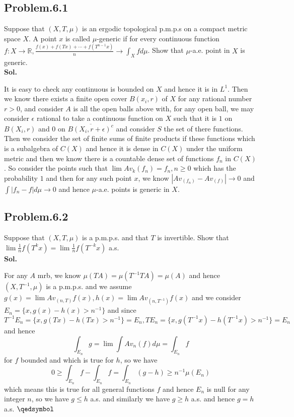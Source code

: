 \documentclass[lang=en,11pt,a4paper,citestyle =authoryear]{elegantpaper}
\newcommand{\prvd}{$\hfill \qedsymbol$}
\newcommand{\R}{\mathbb{R}}
\begin{document}
\vspace{0.5em}

\subsection*{Problem.6.1} 
Suppose that $(X,T,\mu)$ is an ergodic topological p.m.p.s on a compact metric space $X$. A point $x$ is called $\mu$-generic if for every continuous function $f:X\to\R, \tfrac{f(x)+f(Tx)+\cdots+f(T^{n-1}x)}{n} \to \int_X fd\mu$. Show that $\mu$-a.e. point in $X$ is generic.
\vspace{0.5em}\\
\textbf{Sol.} \par
It is easy to check any continuous is bounded on $X$ and hence it is in $L^1$. Then we know there exists a finite open cover $B(x_i,r)$ of $X$ for any rational number $r>0$, and consider $A$ is all the open balls above with, for any open ball, we may consider $\epsilon$ rational to take a continuous function on $X$ such that it is $1$ on $B(X_i,r)$ and $0$ on $\overline{B(X_i,r+\epsilon)^c}$ and consider $S$ the set of there functions. Then we consider the set of finite sums of finite products if these functions which is a subalgebra of $C(X)$ and hence it is dense in $C(X)$ under the uniform metric and then we know there is a countable dense set of functions $f_n$ in $C(X)$. So consider  the points such that $\lim Av_k(f_n) = f_n, n\geq 0$ which has the probability $1$ and then for any such point $x$, we know $|Av_(f_n)-Av_(f)| \to 0$ and $\int |f_n-f|d\mu \to 0$ and hence $\mu$-a.e. points is generic in $X$.
\vspace{0.5em}

\subsection*{Problem.6.2}
Suppose that $(X,T,\mu)$ is a p.m.p.s. and that $T$ is invertible. Show that $\lim \tfrac{1}{n}f(T^k x) = \lim \tfrac{1}{n}f(T^{-k} x)$ a.s.
\vspace{0.5em}\\
\textbf{Sol.} \par
For any $A$ mrb, we know $\mu(TA) = \mu(T^{-1}TA) = \mu(A)$ and hence $(X,T^{-1},\mu)$ is a p.m.p.s. and we  assume $g(x) = \lim Av_{(n,T)}f(x), h(x) = \lim Av_{(n,T^{-1})} f(x)$ and we consider $E_n = \{x, g(x)-h(x) > n^{-1}\}$ and since $T^{-1}E_n = \{x, g(Tx)-h(Tx) > n^{-1}\} = E_n, TE_n = \{x, g(T^{-1}x)-h(T^{-1}x) >n^{-1}\} = E_n$ and hence
\[\int_{E_n} g = \lim \int Av_n(f)d\mu = \int_{E_n} f\]
for $f$ bounded and which is true for $h$, so we have
\[0 \geq \int_{E_n} f - \int_{E_n} f = \int_{E_n} (g-h) \geq n^{-1}\mu(E_n)\]
which means this is true for all general functions $f$
and hence $E_n$ is null for any integer $n$, so we have $g\leq h$ a.s. and similarly we have $g\geq h$ a.s. and hence $g= h$ a.s.
\prvd
\vspace{0.5em}
\end{document}
